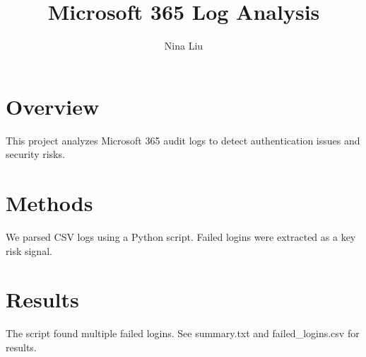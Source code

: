 \documentclass{article}
\title{Microsoft 365 Log Analysis}
\author{Nina Liu}
\begin{document}
\maketitle

\section{Overview}
This project analyzes Microsoft 365 audit logs to detect authentication issues and security risks.

\section{Methods}
We parsed CSV logs using a Python script. Failed logins were extracted as a key risk signal.

\section{Results}
The script found multiple failed logins. See summary.txt and failed_logins.csv for results.
\end{document}
